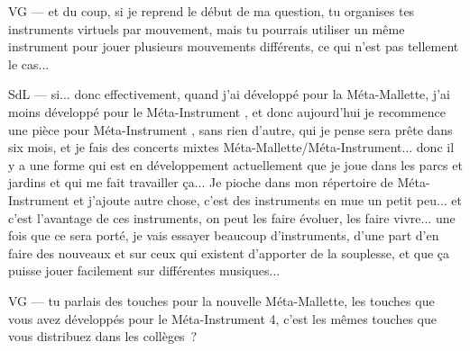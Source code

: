 VG — et du coup, si je reprend le début de ma question, tu organises tes instruments virtuels par mouvement, mais tu pourrais utiliser un même instrument pour jouer plusieurs mouvements différents, ce qui n'est pas tellement le cas... 

SdL — si... donc effectivement, quand j'ai développé pour la Méta-Mallette, j'ai moins développé pour le Méta-Instrument , et donc aujourd'hui je recommence une pièce pour Méta-Instrument , sans rien d'autre, qui je pense sera prête dans six mois, et je fais des concerts mixtes Méta-Mallette/Méta-Instrument... donc il y a une forme qui est en développement actuellement que je joue dans les parcs et jardins et qui me fait travailler ça... Je pioche dans mon répertoire de Méta-Instrument et j'ajoute autre chose, c'est des instruments en mue un petit peu... et c'est l'avantage de ces instruments, on peut les faire évoluer, les faire vivre... une fois que ce sera porté, je vais essayer beaucoup d'instruments, d'une part d'en faire des nouveaux et sur ceux qui existent d'apporter de la souplesse, et que ça puisse jouer facilement sur différentes musiques... 

VG — tu parlais des touches pour la nouvelle Méta-Mallette, les touches que vous avez développés pour le Méta-Instrument 4, c'est les mêmes touches que vous distribuez dans les collèges ? 


